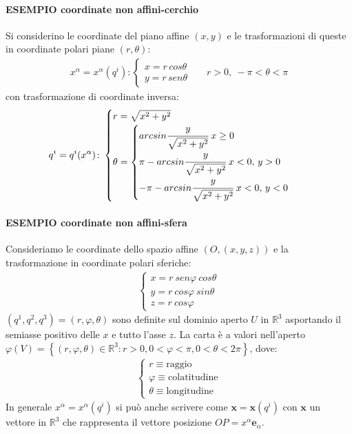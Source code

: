 \paragraph{ESEMPIO coordinate non affini-cerchio}
Si considerino le coordinate del piano affine $(x,y)$ e le trasformazioni di queste in coordinate polari piane $(r,\theta)$:
\begin{align*}
x^\alpha=x^\alpha(q^i)\colon\begin{cases}
    x=r\,cos\theta\\
    y=r\,sen\theta
    \end{cases} &&r>0,\: -\pi<\theta<\pi
\end{align*}%
con trasformazione di coordinate inversa:
\begin{align*}
q^i=q^i(x^\alpha)\colon \begin{cases}
r=\sqrt{x^2+y^2}\\
\theta=\begin{cases}
arcsin\cfrac{y}{\sqrt{x^2+y^2}}\;x\ge 0 \\
\pi-arcsin\cfrac{y}{\sqrt{x^2+y^2}}\; x<0,\,y>0\\
-\pi-arcsin\cfrac{y}{\sqrt{x^2+y^2}}\;x<0,\,y<0
\end{cases}
    \end{cases}
\end{align*}
\paragraph{ESEMPIO coordinate non affini-sfera} Consideriamo le coordinate dello spazio affine $(O,(x,y,z))$ e la trasformazione in coordinate polari sferiche:
\begin{align*}
\begin{cases}
x=r\:sen\varphi\:cos\theta\\
y=r\:cos\varphi\:sin\theta\\
 z=r\:cos\varphi
    \end{cases}
\end{align*}
$(q^1,q^2,q^3)=(r,\varphi,\theta)$ sono definite sul dominio aperto $U$ in $\mathbb{R}^3$ asportando il semiasse positivo delle $x$ e tutto l'asse $z$. La carta è a valori nell'aperto $\varphi(V)=\left\{(r,\varphi,\theta)\in \mathbb{R}^3\colon r>0, 0<\varphi<\pi, 0<\theta<2\pi\right\}$, dove:
\begin{align*}
    \begin{cases}
        r\equiv\text{raggio}\\
        \varphi\equiv\text{colatitudine}\\
        \theta\equiv \text{longitudine}
    \end{cases}
\end{align*}
In generale $x^\alpha=x^\alpha(q^i)$ si può anche scrivere come $\textbf{x}=\mathbf{x}(q^i)$ con $\mathbf{x}$ un vettore in $\mathbb{R}^3$ che rappresenta il vettore posizione $OP=x^\alpha \mathbf{e}_\alpha$.
